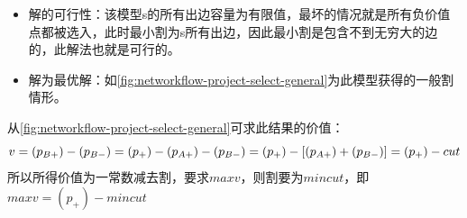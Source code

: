 \begin{itemize}
	\item 解的可行性：该模型s的所有出边容量为有限值，最坏的情况就是所有负价值点都被选入，此时最小割为s所有出边，因此最小割是包含不到无穷大的边的，此解法也就是可行的。
	\item 解为最优解：如\autoref{fig:networkflow-project-select-general}为此模型获得的一般割情形。
\end{itemize}
从\autoref{fig:networkflow-project-select-general}可求此结果的价值：
\begin{equation}
	v = (p_{B+}) - (p_{B-}) = (p_+) - (p_{A+}) - (p_{B-}) = (p_+) - [(p_{A+}) + (p_{B-})] = (p_+) - cut\\
\end{equation}
所以所得价值为一常数减去割，要求\(maxv\)，则割要为\(mincut\)，即\(maxv = (p_+) -mincut\)
